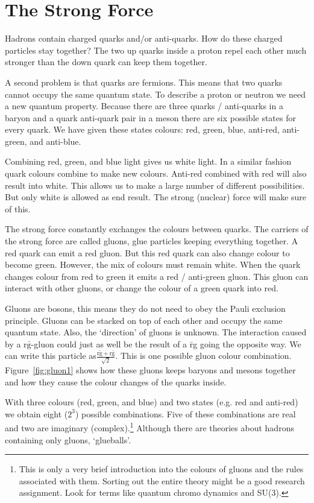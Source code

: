 \documentclass[12pt,a4paper]{article}
\numberwithin{equation}{section}
\numberwithin{figure}{section}
\numberwithin{table}{section}
\begin{document}
\section{The Strong Force}
Hadrons contain charged quarks and/or anti-quarks. How do these charged particles stay together? The two up quarks inside a proton repel each other much stronger than the down quark can keep them together.

A second problem is that quarks are fermions. This means that two quarks cannot occupy the same quantum state. To describe a proton or neutron we need a new quantum property. Because there are three quarks / anti-quarks in a baryon and a quark anti-quark pair in a meson there are six possible states for every quark. We have given these states colours: red, green, blue, anti-red, anti-green, and anti-blue.

Combining red, green, and blue light gives us white light. In a similar fashion quark colours combine to make new colours. Anti-red combined with red will also result into white. This allows us to make a large number of different possibilities. But only white is allowed as end result. The strong (nuclear) force will make sure of this.

The strong force constantly exchanges the colours between quarks. The carriers of the strong force are called gluons, glue particles keeping everything together. A red quark can emit a red gluon. But this red quark can also change colour to become green. However, the mix of colours must remain white. When the quark changes colour from red to green it emits a red / anti-green gluon. This gluon can interact with other gluons, or change the colour of a green quark into red.

Gluons are bosons, this means they do not need to obey the Pauli exclusion principle. Gluons can be stacked on top of each other and occupy the same quantum state. Also, the `direction' of gluons is unknown. The interaction caused by a r$\bar{\mbox{g}}$-gluon could just as well be the result of a $\bar{\mbox{r}}$g going the opposite way. We can write this particle as$\frac{\bar{\mbox{rg}}+\mbox{r}\bar{\mbox{g}}}{\sqrt{2}}$. This is one possible gluon colour combination. Figure~\ref{fig:gluon1} shows how these gluons keeps baryons and mesons together and how they cause the colour changes of the quarks inside.

With three colours (red, green, and blue) and two states (e.g. red and anti-red) we obtain eight ($2^3$) possible combinations. Five of these combinations are real and two are imaginary (complex).\footnote{This is only a very brief introduction into the colours of gluons and the rules associated with them. Sorting out the entire theory might be a good research assignment. Look for terms like quantum chromo dynamics and SU(3).} Although there are theories about hadrons containing only gluons, `glueballs'.
\end{document}
